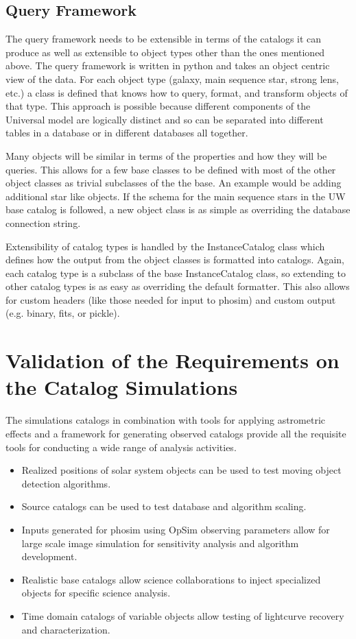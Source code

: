 \documentclass[]{article}
\begin{document}
\subsection{Query Framework}
The query framework needs to be extensible in terms of the catalogs it can produce
as well as extensible to object types other than the ones mentioned above.  
The query framework is written in python and takes an object centric view of the 
data.  For each object type (galaxy, main sequence star, strong lens, etc.) a class
is defined that knows how to query, format, and transform objects of that type.  
This approach is possible because different components of the Universal model
are logically distinct and so can be separated into different tables in a database
or in different databases all together.

Many objects will be similar in terms of the properties and how they will be queries.
This allows for a few base classes to be defined with most of the other object
classes as trivial subclasses of the the base.  An example would be adding additional
star like objects.  If the schema for the main sequence stars in the UW base catalog
is followed, a new object class is as simple as overriding the database connection string.

Extensibility of catalog types is handled by the InstanceCatalog class which defines how
the output from the object classes is formatted into catalogs.  Again, each catalog
type is a subclass of the base InstanceCatalog class, so extending to other catalog
types is as easy as overriding the default formatter.  This also allows for custom headers
(like those needed for input to phosim) and custom output (e.g. binary, fits, or pickle).


\section{Validation of the Requirements on the Catalog Simulations}
The simulations catalogs in combination with tools for applying astrometric effects and a 
framework for generating observed catalogs provide all the requisite tools for conducting a 
wide range of analysis activities.
\begin{itemize}
\item Realized positions of solar system objects can be used to test moving object detection algorithms.
\item Source catalogs can be used to test database and algorithm scaling.
\item Inputs generated for phosim using OpSim observing parameters allow for large scale image simulation
for sensitivity analysis and algorithm development.
\item Realistic base catalogs allow science collaborations to inject specialized objects for specific science
analysis.
\item Time domain catalogs of variable objects allow testing of lightcurve recovery and characterization.
\end{itemize}
\end{document}
